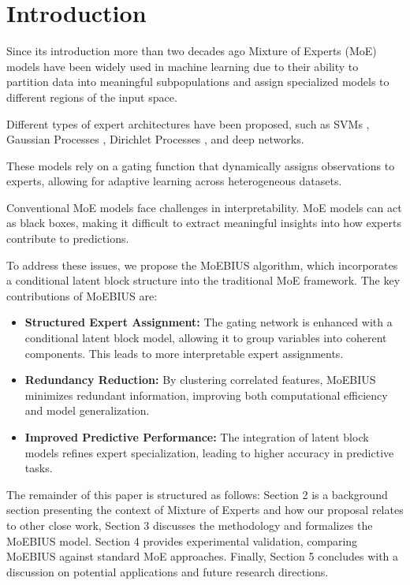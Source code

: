 \section{Introduction}


Since its introduction more than two decades ago \citep{jacobs1991adaptive}
Mixture of Experts (MoE) models have been widely used in machine learning due to their ability to partition data into meaningful subpopulations and assign specialized models to different regions of the input space. 

Different types of expert
architectures have been proposed, such as SVMs \citep{Collobert2002}, Gaussian Processes \citep{Tresp2001, Theis2015, Deisenroth2015}, Dirichlet Processes \citep{Shahbaba2009},
and deep networks.

These models rely on a gating function that dynamically assigns observations to experts, allowing for adaptive learning across heterogeneous datasets. 

Conventional MoE models face challenges in interpretability. MoE models can act as black boxes, making it difficult to extract meaningful insights into how experts contribute to predictions.

To address these issues, we propose the MoEBIUS algorithm, which incorporates a conditional latent block structure into the traditional MoE framework. The key contributions of MoEBIUS are:
\begin{itemize}
    \item \textbf{Structured Expert Assignment:} The gating network is enhanced with a conditional latent block model, allowing it to group variables into coherent components. This leads to more interpretable expert assignments.
    \item \textbf{Redundancy Reduction:} By clustering correlated features, MoEBIUS minimizes redundant information, improving both computational efficiency and model generalization.
    \item \textbf{Improved Predictive Performance:} The integration of latent block models refines expert specialization, leading to higher accuracy in predictive tasks.
\end{itemize}

The remainder of this paper is structured as follows: Section 2 is a background section presenting the  context of Mixture of Experts  and how our proposal relates to other close work,  Section 3 discusses the methodology and formalizes the MoEBIUS model.  
Section 4 provides experimental validation, comparing MoEBIUS against standard MoE approaches. Finally, Section 5 concludes with a discussion on potential applications and future research directions.
